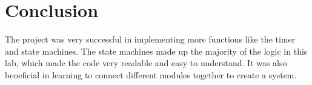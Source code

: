 \documentclass[11pt]{article}
\begin{document}
\section*{Conclusion}

The project was very successful in implementing more functions like the timer and state machines. The state machines made up the majority of the logic in this lab, which made the code very readable and easy to understand. It was also beneficial in learning to connect different modules together to create a system. 
\end{document}
